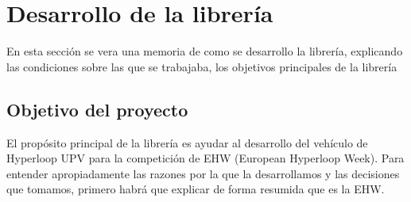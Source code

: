 \documentclass{report}
\begin{document}
\section{Desarrollo de la librería}

En esta sección se vera una memoria de como se desarrollo la librería, explicando las condiciones sobre las que se trabajaba, los objetivos principales de la librería \par

\subsection{Objetivo del proyecto}
El propósito principal de la librería es ayudar al desarrollo del vehículo de Hyperloop UPV para la competición de EHW (European Hyperloop Week). Para entender apropiadamente las razones por la que la desarrollamos y las decisiones que tomamos, primero habrá que explicar de forma resumida que es la EHW. \cite{web:EHW:homepage} \par \vspace{0.3 cm}
\end{document}
